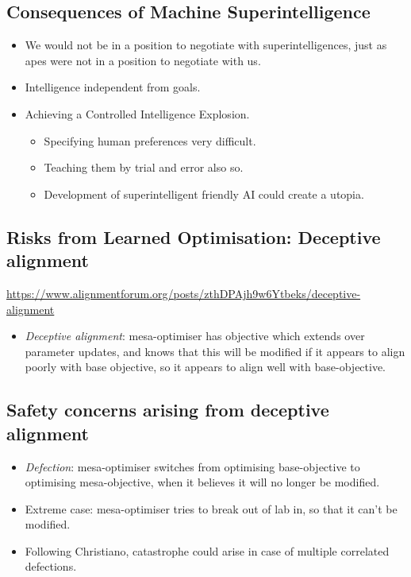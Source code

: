 \subsection{Consequences of Machine Superintelligence}

\begin{itemize}
    \item We would not be in a position to negotiate with superintelligences, just as apes were not in a position to negotiate with us.
    \item Intelligence independent from goals.
    \item Achieving a Controlled Intelligence Explosion.
    \begin{itemize}
        \item Specifying human preferences very difficult.
        \item Teaching them by trial and error also so.
        \item Development of superintelligent friendly AI could create a utopia.
    \end{itemize}
\end{itemize}


\subsection{Risks from Learned Optimisation: Deceptive alignment}

\url{https://www.alignmentforum.org/posts/zthDPAjh9w6Ytbeks/deceptive-alignment}

\begin{itemize}
    \item \emph{Deceptive alignment}: mesa-optimiser has objective which extends over parameter updates, and knows that this will be modified if it appears to align poorly with base objective, so it appears to align well with base-objective.
\end{itemize}


\subsection{Safety concerns arising from deceptive alignment}

\begin{itemize}
    \item \emph{Defection}: mesa-optimiser switches from optimising base-objective to optimising mesa-objective, when it believes it will no longer be modified.
    \item Extreme case: mesa-optimiser tries to break out of lab in, so that it can't be modified.
    \item Following Christiano, catastrophe could arise in case of multiple correlated defections.
\end{itemize}


